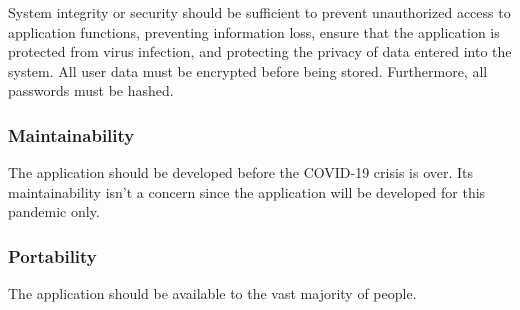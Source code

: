 System integrity or security should be sufficient to prevent unauthorized access to application functions, preventing information loss, ensure that the application is protected from virus infection, and protecting the privacy of data entered into the system.
All user data must be encrypted before being stored.
Furthermore, all passwords must be hashed.

\subsubsection{Maintainability}


The application should be developed before the COVID-19 crisis is over.
Its maintainability isn't a concern since the application will be developed for this pandemic only.

\subsubsection{Portability}


The application should be available to the vast majority of people.
